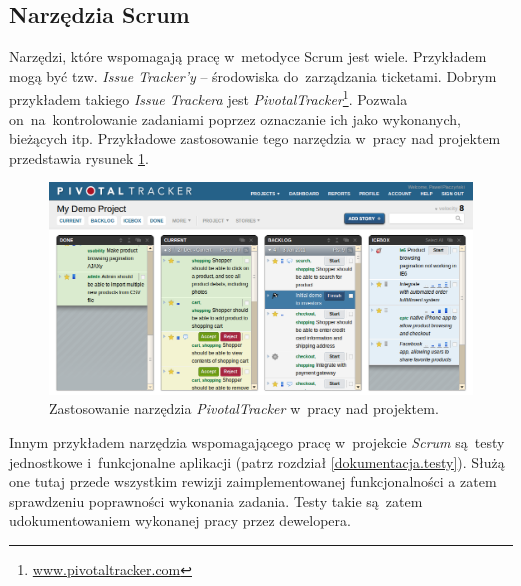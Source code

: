 \subsection{Narzędzia Scrum} \label{scrum.narzedzia}

Narzędzi, które wspomagają pracę w~metodyce Scrum jest wiele. Przykładem mogą być tzw. \textit{Issue Tracker'y} -- środowiska do~zarządzania ticketami. Dobrym przykładem takiego \textit{Issue Trackera} jest \textit{PivotalTracker}\footnote{\url{www.pivotaltracker.com}}. Pozwala on~na~kontrolowanie zadaniami poprzez oznaczanie ich jako wykonanych, bieżących itp. Przykładowe zastosowanie tego narzędzia w~pracy nad projektem przedstawia rysunek \ref{fig.rysunek.pivotal}.

\begin{figure}[!t]
\centering
\includegraphics[width=\textwidth]{obrazki/pivotal.png}
\caption{Zastosowanie narzędzia \textit{PivotalTracker} w~pracy nad projektem. \cite{pivotaltracker}}
\label{fig.rysunek.pivotal}
\end{figure}

Innym przykładem narzędzia wspomagającego pracę w~projekcie \textit{Scrum} są~testy jednostkowe i~funkcjonalne aplikacji (patrz rozdział \ref{dokumentacja.testy}). Służą one tutaj przede wszystkim rewizji zaimplementowanej funkcjonalności a zatem sprawdzeniu poprawności wykonania zadania. Testy takie są~zatem udokumentowaniem wykonanej pracy przez dewelopera.
